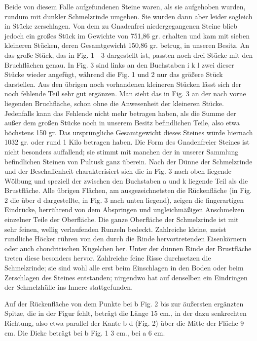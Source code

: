 \documentclass[a4paper, 11pt, oneside]{article}
\begin{document}
Beide von diesem Falle aufgefundenen Steine waren, als sie aufgehoben wurden, rundum mit dunkler Schmelzrinde umgeben. Sie wurden dann aber leider sogleich in Stücke zerschlagen. Von dem zu Gnadenfrei niedergegangenen Steine blieb jedoch ein großes Stück im Gewichte von 751,86 gr. erhalten und kam mit sieben kleineren Stücken, deren Gesamtgewicht 150,86 gr. betrug, in unseren Besitz. An das große Stück, das in Fig. 1---3 dargestellt ist, passten noch drei Stücke mit den Bruchflächen genau. In Fig. 3 sind links an den Buchstaben i k l zwei dieser Stücke wieder angefügt, während die Fig. 1 und 2 nur das größere Stück darstellen. Aus den übrigen noch vorhandenen kleineren Stücken lässt sich der noch fehlende Teil sehr gut ergänzen. Man sieht das in Fig. 3 an der nach vorne liegenden Bruchfläche, schon ohne die Anwesenheit der kleineren Stücke. Jedenfalls kann das Fehlende nicht mehr betragen haben, als die Summe der außer dem großen Stücke noch in unserem Besitz befindlichen Teile, also etwa höchstens 150 gr. Das ursprüngliche Gesamtgewicht dieses Steines würde hiernach 1032 gr. oder rund 1 Kilo betragen haben. Die Form des Gnadenfreier Steines ist nicht besonders auffallend; sie stimmt mit manchen der in unserer Sammlung befindlichen Steinen von Pultusk ganz überein. Nach der Dünne der Schmelzrinde und der Beschaffenheit charakterisiert sich die in Fig. 3 nach oben liegende Wölbung und speziell der zwischen den Buchstaben a und k liegende Teil als die Brustfläche. Alle übrigen Flächen, am ausgezeichnetsten die Rückenfläche (in Fig. 2 die über d dargestellte, in Fig. 3 nach unten liegend), zeigen die fingerartigen Eindrücke, herrührend von dem Abspringen und ungleichmäßigen Anschmelzen einzelner Teile der Oberfläche. Die ganze Oberfläche der Schmelzrinde ist mit sehr feinen, wellig verlaufenden Runzeln bedeckt. Zahlreiche kleine, meist rundliche Höcker rühren von den durch die Rinde hervortretenden Eisenkörnern oder auch chondritischen Kügelchen her. Unter der dünnen Rinde der Brustfläche treten diese besonders hervor. Zahlreiche feine Risse durchsetzen die Schmelzrinde; sie sind wohl alle erst beim Einschlagen in den Boden oder beim Zerschlagen des Steines entstanden; nirgendwo hat auf denselben ein Eindringen der Schmelzhülle ins Innere stattgefunden.

Auf der Rückenfläche von dem Punkte bei b Fig. 2 bis zur äußersten ergänzten Spitze, die in der Figur fehlt, beträgt die Länge 15 cm., in der dazu senkrechten Richtung, also etwa parallel der Kante b d (Fig. 2) über die Mitte der Fläche 9 cm. Die Dicke beträgt bei b Fig. 1 3 cm., bei a 6 cm.
\end{document}
